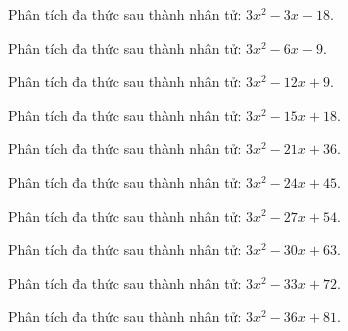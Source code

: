 \begin{bt}
	Phân tích đa thức sau thành nhân tử: $3 x^2 - 3 x - 18$.
\end{bt}
\begin{bt}
	Phân tích đa thức sau thành nhân tử: $3 x^2 - 6 x - 9$.
\end{bt}
\begin{bt}
	Phân tích đa thức sau thành nhân tử: $3 x^2 - 12 x + 9$.
\end{bt}
\begin{bt}
	Phân tích đa thức sau thành nhân tử: $3 x^2 - 15 x + 18$.
\end{bt}
\begin{bt}
	Phân tích đa thức sau thành nhân tử: $3 x^2 - 21 x + 36$.
\end{bt}
\begin{bt}
	Phân tích đa thức sau thành nhân tử: $3 x^2 - 24 x + 45$.
\end{bt}
\begin{bt}
	Phân tích đa thức sau thành nhân tử: $3 x^2 - 27 x + 54$.
\end{bt}
\begin{bt}
	Phân tích đa thức sau thành nhân tử: $3 x^2 - 30 x + 63$.
\end{bt}
\begin{bt}
	Phân tích đa thức sau thành nhân tử: $3 x^2 - 33 x + 72$.
\end{bt}
\begin{bt}
	Phân tích đa thức sau thành nhân tử: $3 x^2 - 36 x + 81$.
\end{bt}
